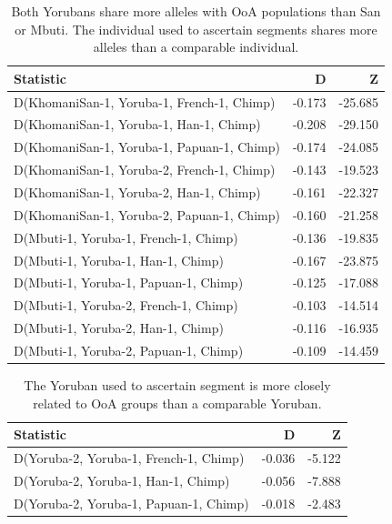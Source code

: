 \documentclass{article}
\begin{document}
\begin{table}[ht]
\centering
\begin{tabular}{lrr}
  \hline
Statistic & D & Z \\ 
  \hline
D(KhomaniSan-1, Yoruba-1, French-1, Chimp) & -0.173 & -25.685 \\ 
  D(KhomaniSan-1, Yoruba-1, Han-1, Chimp) & -0.208 & -29.150 \\ 
  D(KhomaniSan-1, Yoruba-1, Papuan-1, Chimp) & -0.174 & -24.085 \\ 
  D(KhomaniSan-1, Yoruba-2, French-1, Chimp) & -0.143 & -19.523 \\ 
  D(KhomaniSan-1, Yoruba-2, Han-1, Chimp) & -0.161 & -22.327 \\ 
  D(KhomaniSan-1, Yoruba-2, Papuan-1, Chimp) & -0.160 & -21.258 \\ 
  D(Mbuti-1, Yoruba-1, French-1, Chimp) & -0.136 & -19.835 \\ 
  D(Mbuti-1, Yoruba-1, Han-1, Chimp) & -0.167 & -23.875 \\ 
  D(Mbuti-1, Yoruba-1, Papuan-1, Chimp) & -0.125 & -17.088 \\ 
  D(Mbuti-1, Yoruba-2, French-1, Chimp) & -0.103 & -14.514 \\ 
  D(Mbuti-1, Yoruba-2, Han-1, Chimp) & -0.116 & -16.935 \\ 
  D(Mbuti-1, Yoruba-2, Papuan-1, Chimp) & -0.109 & -14.459 \\ 
   \hline
\end{tabular}
\caption{Both Yorubans share more alleles with OoA populations than San or Mbuti. The individual used to ascertain segments shares more alleles than a comparable individual.} 
\label{dstats:a2}
\end{table}
\begin{table}[ht]
\centering
\begin{tabular}{lrr}
  \hline
Statistic & D & Z \\ 
  \hline
D(Yoruba-2, Yoruba-1, French-1, Chimp) & -0.036 & -5.122 \\ 
  D(Yoruba-2, Yoruba-1, Han-1, Chimp) & -0.056 & -7.888 \\ 
  D(Yoruba-2, Yoruba-1, Papuan-1, Chimp) & -0.018 & -2.483 \\ 
   \hline
\end{tabular}
\caption{The Yoruban used to ascertain segment is more closely related to OoA groups than a comparable Yoruban.} 
\label{dstats:a3}
\end{table}
\end{document}
